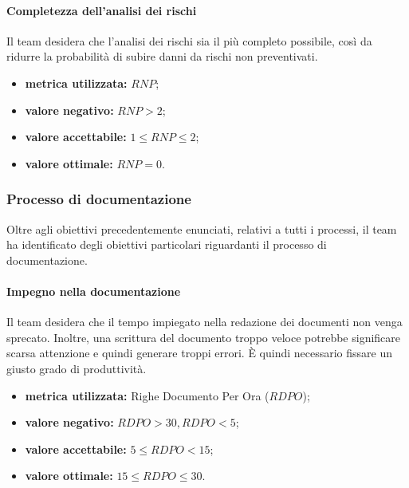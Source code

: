 			\paragraph{Completezza dell'analisi dei rischi}
				\label{OCDADR}
				Il team desidera che l'analisi dei rischi sia il più completo possibile, così da ridurre la probabilità di subire danni da rischi non preventivati. 
				\begin{itemize}
					\item \textbf{metrica utilizzata:} $RNP$;
					\item \textbf{valore negativo:} $RNP>2$;
					\item \textbf{valore accettabile:} $1\leq RNP\leq 2$;
					\item \textbf{valore ottimale:} $RNP=0$.
				\end{itemize}
			
		\subsubsection{Processo di documentazione}
			Oltre agli obiettivi precedentemente enunciati, relativi a tutti i processi, il team ha identificato degli obiettivi particolari riguardanti il processo di documentazione. 
			
			\paragraph{Impegno nella documentazione}
				\label{OIND}
				Il team desidera che il tempo impiegato nella redazione dei documenti non venga sprecato. Inoltre, una scrittura del documento troppo veloce potrebbe significare scarsa attenzione e quindi generare troppi errori. È quindi necessario fissare un giusto grado di produttività.
				\begin{itemize}
					\item \textbf{metrica utilizzata:} Righe Documento Per Ora ($RDPO$);
					\item \textbf{valore negativo:} $RDPO>30, RDPO<5$;
					\item \textbf{valore accettabile:} $5 \leq RDPO <15$;
					\item \textbf{valore ottimale:} $15 \leq RDPO \leq 30$.
				\end{itemize}
			
